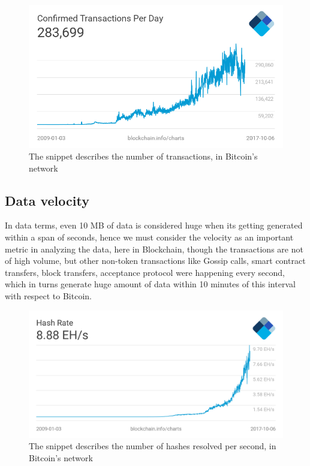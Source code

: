 \documentclass[sigconf]{acmart}
\begin{document}
\begin{figure}
  \centering
  \includegraphics[width=1.0\columnwidth]{images/bitcoin-trans.png}
  \caption{The snippet describes the number of transactions, in Bitcoin's network } 
  \label{fig:Figure1} 
\end{figure}

\subsection{Data velocity}
In data terms, even 10 MB of data is considered huge when its getting generated within a span of seconds, hence we must consider the velocity as an important metric in analyzing the data, here in Blockchain, though the transactions are not of high volume, but other non-token transactions like Gossip calls, smart contract transfers, block transfers, acceptance protocol were happening every second, which in turns generate huge amount of data within 10 minutes of this interval with respect to Bitcoin.

\begin{figure}
  \centering
  \includegraphics[width=1.0\columnwidth]{images/hash-rate.png}
  \caption{The snippet describes the number of hashes resolved per second, in Bitcoin's network \cite{hastratepersec}} 
  \label{fig:Figure2} 
\end{figure}
\end{document}
